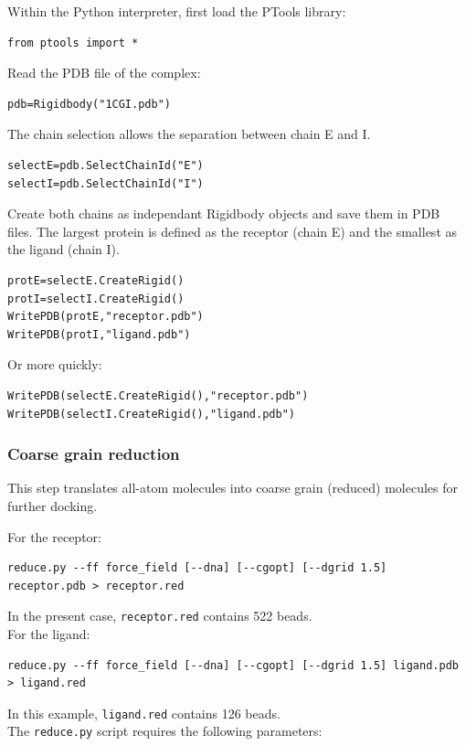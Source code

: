 \documentclass[12pt,a4paper]{article}
\begin{document}
Within the Python interpreter, first load the PTools library:
\begin{verbatim}
from ptools import *
\end{verbatim}

Read the PDB file of the complex:
\begin{verbatim}
pdb=Rigidbody("1CGI.pdb")
\end{verbatim}

The chain selection allows the separation between chain E and I.
\begin{verbatim}
selectE=pdb.SelectChainId("E")
selectI=pdb.SelectChainId("I")
\end{verbatim}

Create both chains as independant Rigidbody objects and save them in PDB files. 
The largest protein is defined as the receptor (chain E) and the smallest 
as the ligand (chain I).

\begin{verbatim}
protE=selectE.CreateRigid()
protI=selectI.CreateRigid()
WritePDB(protE,"receptor.pdb")
WritePDB(protI,"ligand.pdb")
\end{verbatim}
Or more quickly:
\begin{verbatim}
WritePDB(selectE.CreateRigid(),"receptor.pdb")
WritePDB(selectI.CreateRigid(),"ligand.pdb")
\end{verbatim}

\subsubsection{Coarse grain reduction}
This step translates all-atom molecules into coarse grain (reduced) molecules for further docking. 

For the receptor: 
\begin{verbatim}
reduce.py --ff force_field [--dna] [--cgopt] [--dgrid 1.5] receptor.pdb > receptor.red
\end{verbatim}

In the present case, {\tt receptor.red} contains 522 beads.\\

For the ligand:
\begin{verbatim}
reduce.py --ff force_field [--dna] [--cgopt] [--dgrid 1.5] ligand.pdb > ligand.red
\end{verbatim}

In this example, {\tt ligand.red} contains 126 beads. \\

The {\tt reduce.py} script requires the following parameters:
\end{document}
